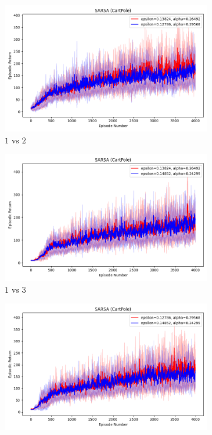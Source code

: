 \documentclass[11pt, a4]{article}
\begin{document}
				\begin{figure}[H]
					\centering
					\begin{subfigure}[h]{.7\textwidth}
						\centering
						\includegraphics[width=\textwidth]{../cartpole-v1/plots/sarsa_Figure_1.png}
						\caption{$1$ vs $2$}
						\label{fig:sarsacartpole1vs2}
					\end{subfigure}
					\hfill
					\begin{subfigure}[h]{0.7\textwidth}
						\centering
						\includegraphics[width=\textwidth]{../cartpole-v1/plots/sarsa_Figure_2.png}
						\caption{$1$ vs $3$}
						\label{fig:sarsacartpole1vs3}
					\end{subfigure}
					\hfill
					\begin{subfigure}[h]{0.7\textwidth}
						\centering
						\includegraphics[width=\textwidth]{../cartpole-v1/plots/sarsa_Figure_3.png}

\end{subfigure}
\end{figure}
\end{document}
